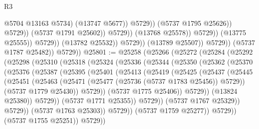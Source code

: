 \begin{lexlean}{R3}
\begin{coremodule}
                                                      @5704
                                                      @13163
                                                      @5734)
                                                    (@13747 @5677))
                                                  @5729))
                                              (@5737 @1795 @25626))
                                            @5729))
                                        (@5737 @1791 @25602))
                                      @5729))
                                  (@13768 @25578))
                                @5729))
                            (@13775 @25555))
                          @5729))
                      (@13782 @25532))
                    @5729))
                (@13789 @25507))
              @5729))
          (@5737 @1787 @25482))
        @5729))
@25801 := @25258
    (@25266
      (@25272
        (@25284
          (@25292
            (@25298
              (@25310
                (@25318
                  (@25324
                    (@25336
                      (@25344
                        (@25350
                          (@25362
                            (@25370
                              (@25376
                                (@25387
                                  (@25395
                                    (@25401
                                      (@25413
                                        (@25419
                                          (@25425
                                            (@25437
                                              (@25445
                                                (@25451
                                                  (@25463
                                                    (@25471
                                                      (@25477 (@25736 (@5737 @1783 @25456)) @5729))
                                                    (@5737 @1779 @25430))
                                                  @5729))
                                              (@5737 @1775 @25406))
                                            @5729))
                                        (@13824 @25380))
                                      @5729))
                                  (@5737 @1771 @25355))
                                @5729))
                            (@5737 @1767 @25329))
                          @5729))
                      (@5737 @1763 @25303))
                    @5729))
                (@5737 @1759 @25277))
              @5729))
          (@5737 @1755 @25251))
        @5729))

\end{coremodule}
\end{lexlean}
